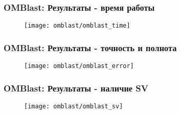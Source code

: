 \begin{frame}
\frametitle{OMBlast: Результаты - время работы}
  \begin{figure}
    \centering
    \texttt{[image: omblast/omblast\_time]}
  \end{figure}

\end{frame}

\begin{frame}
\frametitle{OMBlast: Результаты - точность и полнота }
  \begin{figure}
    \centering
    \texttt{[image: omblast/omblast\_error]}
  \end{figure}

\end{frame}

\begin{frame}
\frametitle{OMBlast: Результаты - наличие SV}
  \begin{figure}
    \centering
    \texttt{[image: omblast/omblast\_sv]}
  \end{figure}

\end{frame}
